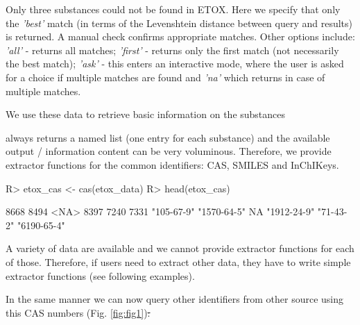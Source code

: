\documentclass[article, shortnames]{jss}\usepackage[]{graphicx}\usepackage[]{color}
\providecommand{\DIFadd}[1]{{\protect\color{blue}\uwave{#1}}} %
\providecommand{\DIFdel}[1]{{\protect\color{red}\sout{#1}}}                      %
\providecommand{\DIFaddbegin}{} %
\providecommand{\DIFaddend}{} %
\providecommand{\DIFdelbegin}{} %
\providecommand{\DIFdelend}{} %
\begin{document}
Only three substances could not be found in ETOX. 
Here we specify that only the \emph{'best'} match (in terms of the Levenshtein distance between query and results) is returned. 
A manual check confirms appropriate matches. 
Other options include: \emph{'all'} - returns all matches; \emph{'first'} - returns only the first match (not necessarily the best match); \emph{'ask'} - this enters an interactive mode, where the user is asked for a choice if multiple matches are found and \emph{'na'} which returns  in case of multiple matches.

We use these data to retrieve basic information on the substances

\begin{CodeChunk}
\end{CodeChunk}

 always returns a named list (one entry for each substance) and the available output / information content can be very voluminous.
Therefore, we provide extractor functions for the common identifiers: CAS, SMILES and InChIKeys.
\begin{CodeChunk}
\begin{CodeInput}
R> etox_cas <- cas(etox_data)
R> head(etox_cas)
\end{CodeInput}
\begin{CodeOutput}
       8668        8494        <NA>        8397        7240        7331 
 "105-67-9" "1570-64-5"          NA "1912-24-9"   "71-43-2" "6190-65-4" 
\end{CodeOutput}
\end{CodeChunk}

A variety of data are available and we cannot provide extractor functions for each of those.
Therefore, if users need to extract other data, they have to write simple extractor functions (see following examples).

In the same manner we can now query other identifiers from other source using this CAS numbers (Fig. \ref{fig:fig1})\DIFdelbegin \DIFdel{:
}\DIFdelend \DIFaddbegin \DIFadd{, like PubChem
}\DIFaddend 
\end{document}
